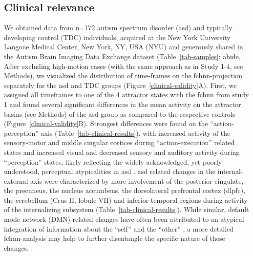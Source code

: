\documentclass{article}
\begin{document}
\subsection{Clinical relevance}

We obtained data from n=172 autism spectrum disorder (\acrshort{asd}) and typically developing control (TDC) individuals, acquired at the New York University Langone Medical Center, New York, NY, USA (NYU) and generously shared in the Autism Brain Imaging Data Exchange dataset (Table~\ref{tab-samples}: \acrshort{abide}, \citep{di2014autism}.
After excluding high-motion cases (with the same approach as in Study 1-4, see Methods), we visualized the distribution of time-frames on the \acrshort{fchnn}-projection separately for the \acrshort{asd} and TDC groups (Figure~\ref{clinical-validity}A).
First, we assigned all timeframes to one of the 4 attractor states with the \acrshort{fchnn} from study 1 and found several significant differences in the mean activity on the attractor basins (see Methods) of the \acrshort{asd} group as compared to the respective controls (Figure~\ref{clinical-validity}B).
Strongest differences were found on the ``action-perception'' axis (Table~\ref{tab-clinical-results}), with increased activity of the sensory-motor and mid\acrshort{dl}e cingular cortices during ``action-execution'' related states and increased visual and decreased sensory and auditory activity during ``perception'' states, likely reflecting the widely acknowledged, yet poorly understood, perceptual atypicalities in \acrshort{asd} \citep{hadad2019perception}. \acrshort{asd} related changes in the internal-external axis were characterized by more involvement of the posterior cingulate, the precuneus, the nucleus accumbens, the dorsolateral prefrontal cortex (\acrshort{dl}\acrshort{pfc}), the cerebellum (Crus II, lobule VII) and inferior temporal regions during activity of the internalizing subsystem (Table~\ref{tab-clinical-results}). While similar, default mode network (DMN)-related changes have often been attributed to an atypical integration of information about the ``self'' and the ``other'' \citep{padmanabhan2017default}, a more detailed \acrshort{fchnn}-analysis may help to further disentangle the specific nature of these changes.
\end{document}
